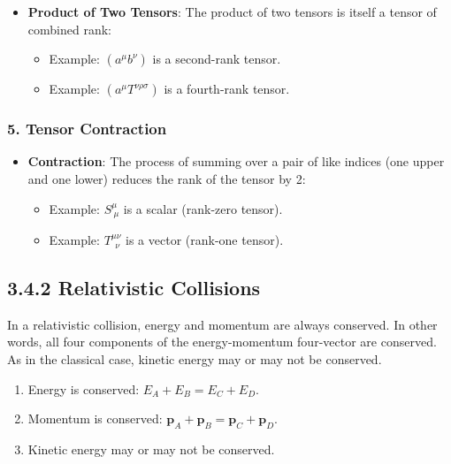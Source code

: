 \documentclass[11pt,letterpaper]{book}
\begin{document}
                \begin{itemize}
                    \item \textbf{Product of Two Tensors}: The product of two tensors is itself a tensor of combined rank:
                    \begin{itemize}
                        \item Example: \( (a^\mu b^\nu) \) is a second-rank tensor.
                        \item Example: \( (a^\mu T^{\nu \rho \sigma}) \) is a fourth-rank tensor.
                    \end{itemize}
                \end{itemize}
            
            \subsubsection*{5. Tensor Contraction}
            
                \begin{itemize}
                    \item \textbf{Contraction}: The process of summing over a pair of like indices (one upper and one lower) reduces the rank of the tensor by 2:
                    \begin{itemize}
                        \item Example: \( S^\mu_{\ \mu} \) is a scalar (rank-zero tensor).
                        \item Example: \( T^{\mu \nu}_{\ \ \nu} \) is a vector (rank-one tensor).
                    \end{itemize}
                \end{itemize}

        \subsection{3.4.2 Relativistic Collisions}
            In a relativistic collision, energy and momentum are always conserved. In other words, all four components of the energy-momentum four-vector are conserved. As in the classical case, kinetic energy may or may not be conserved.
            
            \begin{enumerate}
                \item Energy is conserved: \( E_A + E_B = E_C + E_D \).
                \item Momentum is conserved: \( \mathbf{p}_A + \mathbf{p}_B = \mathbf{p}_C + \mathbf{p}_D \).
                \item Kinetic energy may or may not be conserved.
            \end{enumerate}
            
\end{document}
